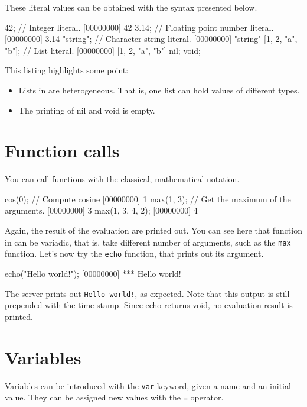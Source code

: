 These literal values can be obtained with the syntax presented below.

\begin{urbiscript}[firstnumber=last]
42; // Integer literal.
[00000000] 42
3.14; // Floating point number literal.
[00000000] 3.14
"string"; // Character string literal.
[00000000] "string"
[1, 2, "a", "b"]; // List literal.
[00000000] [1, 2, "a", "b"]
nil;
void;
\end{urbiscript}

This listing highlights some point:
\begin{itemize}
\item Lists in \us are heterogeneous. That is, one list can hold
  values of different types.
\item The printing of nil and void is empty.
\end{itemize}

\section{Function calls}

You can call functions with the classical, mathematical notation.

\begin{urbiscript}[firstnumber=last]
cos(0); // Compute cosine
[00000000] 1
max(1, 3); // Get the maximum of the arguments.
[00000000] 3
max(1, 3, 4, 2);
[00000000] 4
\end{urbiscript}

Again, the result of the evaluation are printed out. You can see here
that function in \us can be variadic, that is, take different number
of arguments, such as the \lstinline{max} function. Let's now try the
\lstinline{echo} function, that prints out its argument.

\begin{urbiscript}[firstnumber=last]
echo("Hello world!");
[00000000] *** Hello world!
\end{urbiscript}

The server prints out \lstinline{Hello world!}, as expected. Note that
this output is still prepended with the time stamp. Since echo returns
void, no evaluation result is printed.

\section{Variables}
Variables can be introduced with the \lstinline{var} keyword, given a
name and an initial value. They can be assigned new values with the
\lstinline{=} operator.

